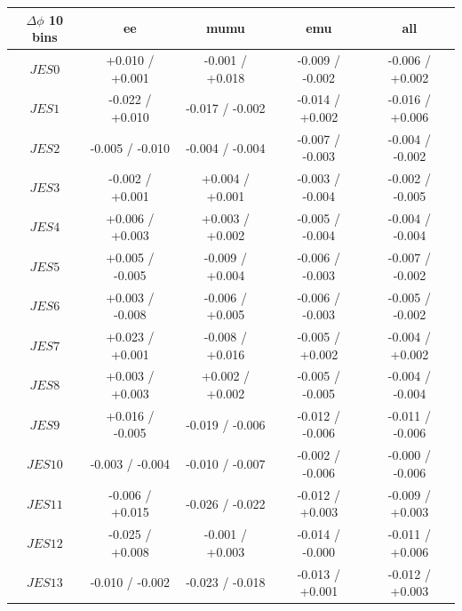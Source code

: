  \begin{table}[htbp]
\footnotesize
   \begin{center}
   \begin{tabular}{|c|c|c|c|c|}
   \hline
     \textbf{$\Delta\phi$ 10 bins}              &  ee &mumu &emu&all\\
   \hline
   $JES 0$                             &  +0.010   / +0.001   & -0.001   / +0.018   & -0.009   / -0.002   & -0.006   / +0.002   \\
   $JES 1$                             &  -0.022   / +0.010   & -0.017   / -0.002   & -0.014   / +0.002   & -0.016   / +0.006   \\
   $JES 2$                             &  -0.005   / -0.010   & -0.004   / -0.004   & -0.007   / -0.003   & -0.004   / -0.002   \\
   $JES 3$                             &  -0.002   / +0.001   & +0.004   / +0.001   & -0.003   / -0.004   & -0.002   / -0.005   \\
   $JES 4$                             &  +0.006   / +0.003   & +0.003   / +0.002   & -0.005   / -0.004   & -0.004   / -0.004   \\
   $JES 5$                             &  +0.005   / -0.005   & -0.009   / +0.004   & -0.006   / -0.003   & -0.007   / -0.002   \\
   $JES 6$                             &  +0.003   / -0.008   & -0.006   / +0.005   & -0.006   / -0.003   & -0.005   / -0.002   \\
   $JES 7$                             &  +0.023   / +0.001   & -0.008   / +0.016   & -0.005   / +0.002   & -0.004   / +0.002   \\
   $JES 8$                             &  +0.003   / +0.003   & +0.002   / +0.002   & -0.005   / -0.005   & -0.004   / -0.004   \\
   $JES 9$                             &  +0.016   / -0.005   & -0.019   / -0.006   & -0.012   / -0.006   & -0.011   / -0.006   \\
   $JES {10}$                          &  -0.003   / -0.004   & -0.010   / -0.007   & -0.002   / -0.006   & -0.000   / -0.006   \\
   $JES {11}$                          &  -0.006   / +0.015   & -0.026   / -0.022   & -0.012   / +0.003   & -0.009   / +0.003   \\
   $JES {12}$                          &  -0.025   / +0.008   & -0.001   / +0.003   & -0.014   / -0.000   & -0.011   / +0.006   \\
   $JES {13}$                          &  -0.010   / -0.002   & -0.023   / -0.018   & -0.013   / +0.001   & -0.012   / +0.003   \\

\end{tabular}
\end{center}
\end{table}
